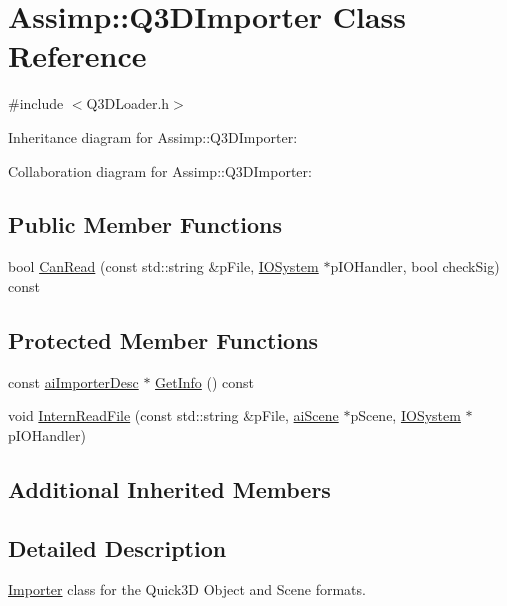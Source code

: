 \hypertarget{class_assimp_1_1_q3_d_importer}{\section{Assimp\+:\+:Q3\+D\+Importer Class Reference}
\label{class_assimp_1_1_q3_d_importer}
}


{\ttfamily \#include $<$Q3\+D\+Loader.\+h$>$}



Inheritance diagram for Assimp\+:\+:Q3\+D\+Importer\+:


Collaboration diagram for Assimp\+:\+:Q3\+D\+Importer\+:
\subsection*{Public Member Functions}
\begin{DoxyCompactItemize}
\item 
bool \hyperlink{class_assimp_1_1_q3_d_importer_a10c41b948aab0f9f6f5f9065dd944874}{Can\+Read} (const std\+::string \&p\+File, \hyperlink{class_assimp_1_1_i_o_system}{I\+O\+System} $\ast$p\+I\+O\+Handler, bool check\+Sig) const 
\end{DoxyCompactItemize}
\subsection*{Protected Member Functions}
\begin{DoxyCompactItemize}
\item 
const \hyperlink{structai_importer_desc}{ai\+Importer\+Desc} $\ast$ \hyperlink{class_assimp_1_1_q3_d_importer_ae95873906d3295d893c9a4af74392595}{Get\+Info} () const 
\item 
void \hyperlink{class_assimp_1_1_q3_d_importer_a7b9e5dbbbdb1b98dbb17e23e7ebc0209}{Intern\+Read\+File} (const std\+::string \&p\+File, \hyperlink{structai_scene}{ai\+Scene} $\ast$p\+Scene, \hyperlink{class_assimp_1_1_i_o_system}{I\+O\+System} $\ast$p\+I\+O\+Handler)
\end{DoxyCompactItemize}
\subsection*{Additional Inherited Members}


\subsection{Detailed Description}
\hyperlink{class_assimp_1_1_importer}{Importer} class for the Quick3\+D Object and Scene formats. 

